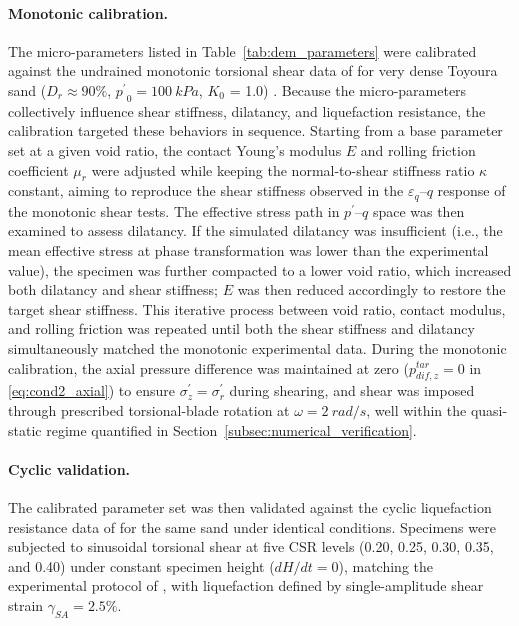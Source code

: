 \documentclass[a4paper,fleqn]{cas-sc}
\newcommand{\Kzero}{\ensuremath{K_0}}
\newcommand{\pmean}{\ensuremath{p^\prime}}
\begin{document}
\paragraph{Monotonic calibration.}
The micro-parameters listed in Table~\ref{tab:dem_parameters} were calibrated against the undrained monotonic torsional shear data of \citet{Nakata1998} for very dense Toyoura sand ($D_r \approx 90\%$, $\pmean_0=\SI{100}{kPa}$, \Kzero{} = 1.0) \citep[see also][]{Ma2024}. Because the micro-parameters collectively influence shear stiffness, dilatancy, and liquefaction resistance, the calibration targeted these behaviors in sequence. Starting from a base parameter set at a given void ratio, the contact Young's modulus $E$ and rolling friction coefficient $\mu_r$ were adjusted while keeping the normal-to-shear stiffness ratio $\kappa$ constant, aiming to reproduce the shear stiffness observed in the $\varepsilon_q$--$q$ response of the monotonic shear tests. The effective stress path in $\pmean$--$q$ space was then examined to assess dilatancy. If the simulated dilatancy was insufficient (i.e., the mean effective stress at phase transformation was lower than the experimental value), the specimen was further compacted to a lower void ratio, which increased both dilatancy and shear stiffness; $E$ was then reduced accordingly to restore the target shear stiffness. This iterative process between void ratio, contact modulus, and rolling friction was repeated until both the shear stiffness and dilatancy simultaneously matched the monotonic experimental data. During the monotonic calibration, the axial pressure difference was maintained at zero ($p_{dif,z}^{tar}=0$ in \cref{eq:cond2_axial}) to ensure $\sigma_z^{\prime}=\sigma_r^{\prime}$ during shearing, and shear was imposed through prescribed torsional-blade rotation at $\omega = \SI{2}{rad/s}$, well within the quasi-static regime quantified in Section~\ref{subsec:numerical_verification}.

\paragraph{Cyclic validation.}
The calibrated parameter set was then validated against the cyclic liquefaction resistance data of \citet{Ishihara1985} for the same sand under identical conditions. Specimens were subjected to sinusoidal torsional shear at five CSR levels (0.20, 0.25, 0.30, 0.35, and 0.40) under constant specimen height ($dH/dt=0$), matching the experimental protocol of \citet{Ishihara1985}, with liquefaction defined by single-amplitude shear strain $\gamma_{SA}=2.5\%$.
\end{document}
